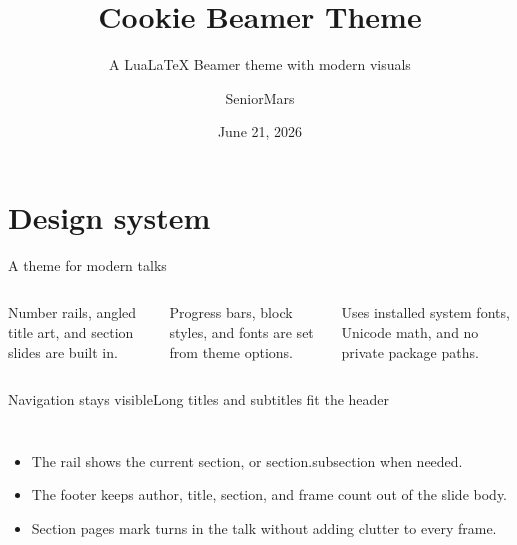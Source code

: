 \documentclass[aspectratio=169]{beamer}
\title[Cookie]{Cookie Beamer Theme}
\subtitle{A LuaLaTeX Beamer theme with modern visuals}
\author[Mars]{SeniorMars}
\institute{Mathematics}
\date{June 21, 2026}
\begin{document}
\maketitle

\section{Design system}

\begin{frame}{A theme for modern talks}
  \begin{columns}[T,onlytextwidth]
      \vspace{.55em}

      Number rails, angled title art, and section slides are built in.

      \vspace{.55em}

      Progress bars, block styles, and fonts are set from theme options.

      \vspace{.55em}

      Uses installed system fonts, Unicode math, and no private package paths.
  \end{columns}

  \vfill
   \hspace{.35em}
   \hspace{.35em}
\end{frame}

\begin{frame}{Navigation stays visible}{Long titles and subtitles fit the header}
  \begin{columns}[T,onlytextwidth]
      \begin{itemize}
        \item The rail shows the current section, or section.subsection when needed.
        \item The footer keeps author, title, section, and frame count out of the slide body.
        \item Section pages mark turns in the talk without adding clutter to every frame.
      \end{itemize}

  \end{columns}
\end{frame}
\end{document}
